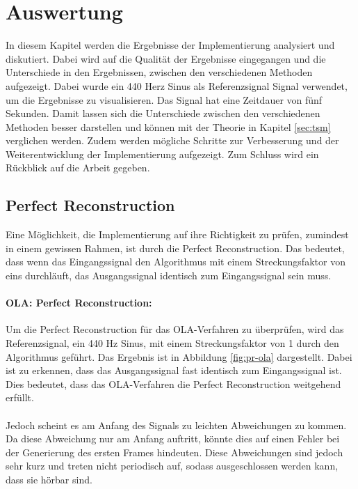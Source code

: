 \section{Auswertung}
\label{sec:auswertung}
In diesem Kapitel werden die Ergebnisse der Implementierung analysiert und diskutiert. Dabei wird auf die Qualität der Ergebnisse eingegangen und die Unterschiede in den Ergebnissen, zwischen den verschiedenen Methoden aufgezeigt. Dabei wurde ein 440 Herz Sinus als Referenzsignal Signal verwendet, um die Ergebnisse zu visualisieren. Das Signal hat eine Zeitdauer von fünf Sekunden. Damit lassen sich die Unterschiede zwischen den verschiedenen Methoden besser darstellen und können mit der Theorie in Kapitel \ref{sec:tsm} verglichen werden. Zudem werden mögliche Schritte zur Verbesserung und der Weiterentwicklung der Implementierung aufgezeigt. Zum Schluss wird ein Rückblick auf die Arbeit gegeben.

\subsection{Perfect Reconstruction}
\label{sec:perfect-reconstruction}
Eine Möglichkeit, die Implementierung auf ihre Richtigkeit zu prüfen, zumindest in einem gewissen Rahmen, ist durch die Perfect Reconstruction. Das bedeutet, dass wenn das Eingangssignal den Algorithmus mit einem Streckungsfaktor von eins durchläuft, das Ausgangssignal identisch zum Eingangssignal sein muss.

\paragraph{OLA: Perfect Reconstruction:}
Um die Perfect Reconstruction für das OLA-Verfahren zu überprüfen, wird das Referenzsignal, ein 440 Hz Sinus, mit einem Streckungsfaktor von 1 durch den Algorithmus geführt. Das Ergebnis ist in Abbildung \ref{fig:pr-ola} dargestellt. Dabei ist zu erkennen, dass das Ausgangssignal fast identisch zum Eingangssignal ist. Dies bedeutet, dass das OLA-Verfahren die Perfect Reconstruction weitgehend erfüllt.

\paragraph{}
Jedoch scheint es am Anfang des Signals zu leichten Abweichungen zu kommen. Da diese Abweichung nur am Anfang auftritt, könnte dies auf einen Fehler bei der Generierung des ersten Frames hindeuten. Diese Abweichungen sind jedoch sehr kurz und treten nicht periodisch auf, sodass ausgeschlossen werden kann, dass sie hörbar sind.

